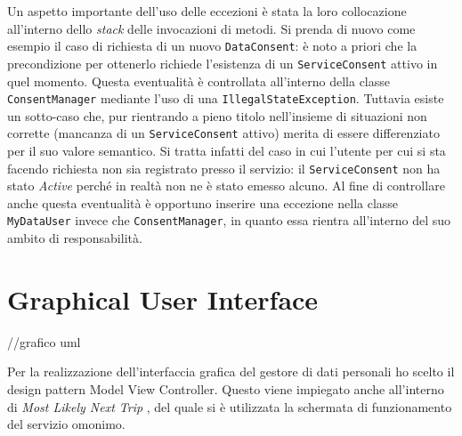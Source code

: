 Un aspetto importante dell’uso delle eccezioni \`e stata la loro collocazione all’interno dello \textit{stack} delle invocazioni di metodi. Si prenda di nuovo come esempio il caso di richiesta di un nuovo \texttt{DataConsent}: \`e noto a priori che la precondizione per ottenerlo richiede l’esistenza di un \texttt{ServiceConsent} attivo in quel momento. Questa eventualit\`a \`e controllata all’interno della classe \texttt{ConsentManager} mediante l’uso di una \texttt{IllegalStateException}. Tuttavia esiste un sotto-caso che, pur rientrando a pieno titolo nell’insieme di situazioni non corrette (mancanza di un \texttt{ServiceConsent} attivo) merita di essere differenziato per il suo valore semantico. Si tratta infatti del caso in cui l’utente per cui si sta facendo richiesta non sia registrato presso il servizio: il \texttt{ServiceConsent} non ha stato \textit{Active} perch\'e in realt\`a non ne \`e stato emesso alcuno. Al fine di controllare anche questa eventualit\`a \`e opportuno inserire una eccezione nella classe \texttt{MyDataUser} invece che \texttt{ConsentManager}, in quanto essa rientra all’interno del suo ambito di responsabilità.

\section{Graphical User Interface}
//grafico uml

Per la realizzazione dell’interfaccia grafica del gestore di dati personali ho scelto il design pattern Model View Controller. Questo viene impiegato anche all’interno di \textit{Most Likely Next Trip} \cite{MLNT}, del quale si \`e utilizzata la schermata di funzionamento del servizio omonimo.

